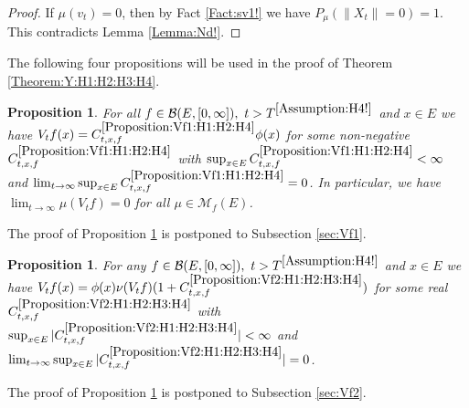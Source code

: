 \documentclass[12pt,a4paper]{amsart}
\numberwithin{equation}{section}
\theoremstyle{plain}
\newtheorem{prop}[thm]{Proposition}
\theoremstyle{definition}
\theoremstyle{remark}
\newcounter{N}
\newcounter{n}[N]
\begin{document}
\begin{proof}
	If $\mu(v_t) = 0$, then by Fact \ref{Fact:sv1!} we have $P_\mu(\|X_t \| = 0) = 1$.
	This contradicts Lemma \ref{Lemma:Nd!}.
\end{proof}

	The following four propositions will be used in the proof of Theorem \ref{Theorem:Y:H1:H2:H3:H4}.

\begin{prop} \label{Proposition:Vf1:H1:H2:H4}
	For all $f\in \mathcal B(E, [0,\infty]),~t > T^{\ref{Assumption:H4!}}$ and $x\in E$ we have $V_tf(x) = C^{\ref{Proposition:Vf1:H1:H2:H4}}_{t,x,f} \phi(x)$ for some non-negative $C_{t,x,f}^{\ref{Proposition:Vf1:H1:H2:H4}}$ with 
 $\sup_{x\in E} C^{\ref{Proposition:Vf1:H1:H2:H4}}_{t,x,f}<\infty$ and 
$ \lim_{t\to \infty} \sup_{x\in E} C^{\ref{Proposition:Vf1:H1:H2:H4}}_{t,x,f} = 0$.
	In particular, we have $\lim_{t\to \infty} \mu(V_tf)= 0 $ for all $\mu \in \mathcal M_f(E)$.
\end{prop}

The proof of Proposition \ref{Proposition:Vf1:H1:H2:H4} is postponed to Subsection \ref{sec:Vf1}.

\begin{prop} \label{Proposition:Vf2:H1:H2:H3:H4}
	For any $f\in \mathcal B(E,[0,\infty]),~t>T^{\ref{Assumption:H4!}}$ and $x\in E$ we have $V_tf(x) = \phi(x) \nu (V_tf) (1+C^{\ref{Proposition:Vf2:H1:H2:H3:H4}}_{t,x,f}) $ for some real $C^{\ref{Proposition:Vf2:H1:H2:H3:H4}}_{t,x,f}$ with $\sup_{x\in E} |C^{\ref{Proposition:Vf2:H1:H2:H3:H4}}_{t,x,f}| < \infty$ and $\lim_{t\to \infty} \sup_{x\in E} |C^{\ref{Proposition:Vf2:H1:H2:H3:H4}}_{t,x,f}| = 0$.
\end{prop}

	The proof of Proposition \ref{Proposition:Vf2:H1:H2:H3:H4} is postponed to Subsection \ref{sec:Vf2}.
\end{document}
